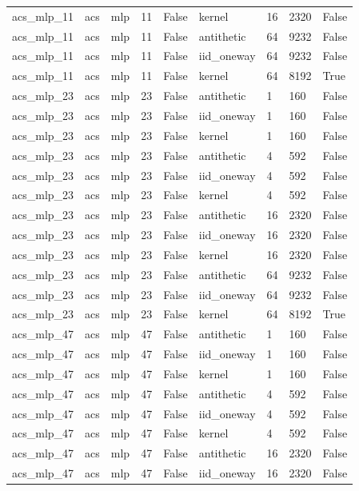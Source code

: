 \begin{tabular}{lllllllll}
acs\_mlp\_11 & acs & mlp & 11 & False & kernel & 16 & 2320 & False \\
acs\_mlp\_11 & acs & mlp & 11 & False & antithetic & 64 & 9232 & False \\
acs\_mlp\_11 & acs & mlp & 11 & False & iid\_oneway & 64 & 9232 & False \\
acs\_mlp\_11 & acs & mlp & 11 & False & kernel & 64 & 8192 & True \\
acs\_mlp\_23 & acs & mlp & 23 & False & antithetic & 1 & 160 & False \\
acs\_mlp\_23 & acs & mlp & 23 & False & iid\_oneway & 1 & 160 & False \\
acs\_mlp\_23 & acs & mlp & 23 & False & kernel & 1 & 160 & False \\
acs\_mlp\_23 & acs & mlp & 23 & False & antithetic & 4 & 592 & False \\
acs\_mlp\_23 & acs & mlp & 23 & False & iid\_oneway & 4 & 592 & False \\
acs\_mlp\_23 & acs & mlp & 23 & False & kernel & 4 & 592 & False \\
acs\_mlp\_23 & acs & mlp & 23 & False & antithetic & 16 & 2320 & False \\
acs\_mlp\_23 & acs & mlp & 23 & False & iid\_oneway & 16 & 2320 & False \\
acs\_mlp\_23 & acs & mlp & 23 & False & kernel & 16 & 2320 & False \\
acs\_mlp\_23 & acs & mlp & 23 & False & antithetic & 64 & 9232 & False \\
acs\_mlp\_23 & acs & mlp & 23 & False & iid\_oneway & 64 & 9232 & False \\
acs\_mlp\_23 & acs & mlp & 23 & False & kernel & 64 & 8192 & True \\
acs\_mlp\_47 & acs & mlp & 47 & False & antithetic & 1 & 160 & False \\
acs\_mlp\_47 & acs & mlp & 47 & False & iid\_oneway & 1 & 160 & False \\
acs\_mlp\_47 & acs & mlp & 47 & False & kernel & 1 & 160 & False \\
acs\_mlp\_47 & acs & mlp & 47 & False & antithetic & 4 & 592 & False \\
acs\_mlp\_47 & acs & mlp & 47 & False & iid\_oneway & 4 & 592 & False \\
acs\_mlp\_47 & acs & mlp & 47 & False & kernel & 4 & 592 & False \\
acs\_mlp\_47 & acs & mlp & 47 & False & antithetic & 16 & 2320 & False \\
acs\_mlp\_47 & acs & mlp & 47 & False & iid\_oneway & 16 & 2320 & False \\

\end{tabular}
